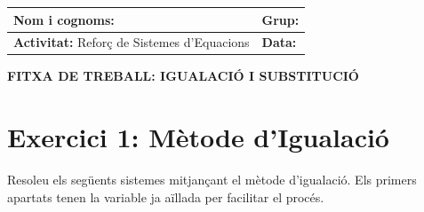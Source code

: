 \documentclass[12pt,a4paper]{article}
\begin{document}
\begingroup
\renewcommand{\arraystretch}{2.2}
\begin{tabularx}{\textwidth}{|X|p{4cm}|}
    \hline
    \textbf{Nom i cognoms:} & \textbf{Grup:} \\ \hline
    \textbf{Activitat:} Reforç de Sistemes d'Equacions & \textbf{Data:} \\ \hline
\end{tabularx}
\endgroup

\vspace{0.8cm}

\begin{center}
    {\Large \textbf{FITXA DE TREBALL: IGUALACIÓ I SUBSTITUCIÓ}}
\end{center}

\section*{Exercici 1: Mètode d'Igualació}
Resoleu els següents sistemes mitjançant el mètode d'igualació.
Els primers apartats tenen la variable ja aïllada per facilitar el procés.
\end{document}
